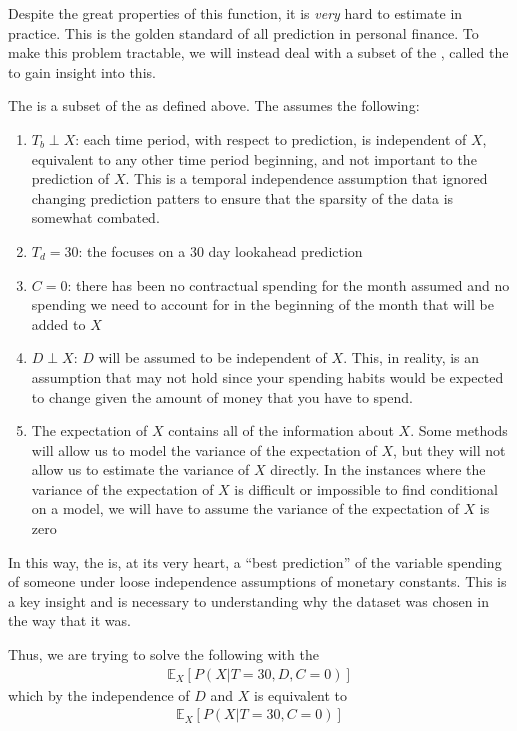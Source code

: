 \documentclass[11pt,a4paper]{article}
\begin{document}
Despite the great properties of this function, it is \textit{very} hard to estimate in practice. This is the golden standard of all prediction in personal finance. To make this problem tractable, we will instead deal with a subset of the \budgetprob, called the \preprob to gain insight into this. 

The \preprob is a subset of the \budgetprob as defined above. The \preprob assumes the following:\

\begin{enumerate}
\item $T_b \perp X$: each time period, with respect to prediction, is independent of $X$, equivalent to any other time period beginning, and not important to the prediction of $X$. This is a temporal independence assumption that ignored changing prediction patters to ensure that the sparsity of the data is somewhat combated. 
\item $T_d = 30$: the \preprob focuses on a 30 day lookahead prediction
\item $C = 0$: there has been no contractual spending for the month assumed and no spending we need to account for in the beginning of the month that will be added to $X$
\item $D \perp X$: $D$ will be assumed to be independent of $X$. This, in reality, is an assumption that may not hold since your spending habits would be expected to change given the amount of money that you have to spend. 
\item The expectation of $X$ contains all of the information about $X$. Some methods will allow us to model the variance of the expectation of $X$, but they will not allow us to estimate the variance of $X$ directly. In the instances where the variance of the expectation of $X$ is difficult or impossible to find conditional on a model, we will have to assume the variance of the expectation of $X$ is zero
\end{enumerate}

In this way, the \preprob is, at its very heart, a ``best prediction'' of the variable spending of someone under loose independence assumptions of monetary constants. This is a key insight and is necessary to understanding why the dataset was chosen in the way that it was. 


Thus, we are trying to solve the following with the \preprob
\begin{align*}
\mathbb{E}_X\left[ P(X | T = 30, D, C = 0) \right]
\end{align*}
which by the independence of $D$ and $X$ is equivalent to
\begin{align*}
\mathbb{E}_X\left[ P(X | T = 30, C = 0) \right]
\end{align*}
\end{document}
